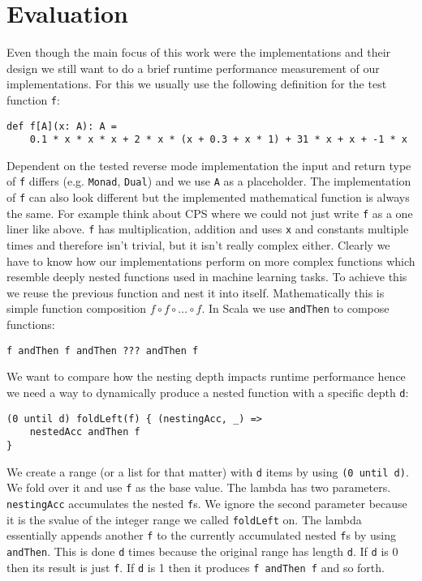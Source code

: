 \chapter{Evaluation}\label{sec:evaluation}

Even though the main focus of this work were the implementations and their design we still want to do a brief runtime performance measurement of our implementations. For this we usually use the following definition for the test function \lstinline{f}:
\begin{lstlisting}
def f[A](x: A): A =
    0.1 * x * x * x + 2 * x * (x + 0.3 + x * 1) + 31 * x + x + -1 * x
\end{lstlisting}
Dependent on the tested reverse mode implementation the input and return type of \lstinline{f} differs (e.g. \lstinline{Monad}, \lstinline{Dual}) and we use \lstinline{A} as a placeholder. The implementation of \lstinline{f} can also look different but the implemented mathematical function is always the same. For example think about CPS where we could not just write \lstinline{f} as a one liner like above.
\lstinline{f} has multiplication, addition and uses \lstinline{x} and constants multiple times and therefore isn't trivial, but it isn't really complex either. Clearly we have to know how our implementations perform on more complex functions which resemble deeply nested functions used in machine learning tasks. To achieve this we reuse the previous function and nest it into itself. Mathematically this is simple function composition
$f \circ f \circ \dots \circ f$. In Scala we use \lstinline{andThen} to compose functions:
\begin{lstlisting}
f andThen f andThen ??? andThen f
\end{lstlisting}
We want to compare how the nesting depth impacts runtime performance hence we need a way to dynamically produce a nested function with a specific depth \lstinline{d}:
\begin{lstlisting}
(0 until d) foldLeft(f) { (nestingAcc, _) =>
    nestedAcc andThen f
}
\end{lstlisting}
We create a range (or a list for that matter) with \lstinline{d} items by using \lstinline{(0 until d)}. We fold over it and use \lstinline{f} as the base value. The lambda has two parameters. \lstinline{nestingAcc} accumulates the nested \lstinline{f}s. We ignore the second parameter because it is the svalue of the integer range we called \lstinline{foldLeft} on. The lambda essentially appends another \lstinline{f} to the currently accumulated nested \lstinline{f}s by using \lstinline{andThen}. This is done \lstinline{d} times because the original range has length \lstinline{d}. If \lstinline{d} is 0 then its result is just \lstinline{f}. If \lstinline{d} is 1 then it produces \lstinline{f andThen f} and so forth.

